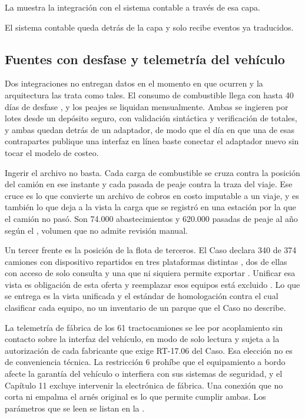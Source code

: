 La  muestra la integración con el sistema contable a través de esa capa.


El sistema contable queda detrás de la capa y solo recibe eventos ya traducidos.


\clearpage
\subsection{Fuentes con desfase y telemetría del vehículo}\label{sec:4-desfase}

Dos integraciones no entregan datos en el momento en que ocurren y la arquitectura las trata como
tales. El consumo de combustible llega con hasta 40 días de desfase , y los
peajes se liquidan mensualmente. Ambas se ingieren por lotes desde un depósito seguro, con validación
sintáctica y verificación de totales, y ambas quedan detrás de un adaptador, de modo que el día en que
una de esas contrapartes publique una interfaz en línea baste conectar el adaptador nuevo sin tocar el
modelo de costeo.

Ingerir el archivo no basta. Cada carga de combustible se cruza contra la posición del camión en ese
instante y cada pasada de peaje contra la traza del viaje. Ese cruce es lo que convierte un archivo de
cobros en costo imputable a un viaje, y es también lo que deja a la vista la carga que se registró en
una estación por la que el camión no pasó. Son 74.000 abastecimientos y 620.000 pasadas de peaje al año
según el , volumen que no admite revisión manual.

Un tercer frente es la posición de la flota de terceros. El Caso declara 340 de 374 camiones con
dispositivo repartidos en tres plataformas distintas , dos de ellas con acceso
de solo consulta y una que ni siquiera permite exportar . Unificar esa vista es
obligación de esta oferta y reemplazar esos equipos está excluido . Lo que se
entrega es la vista unificada y el estándar de homologación contra el cual clasificar cada equipo, no
un inventario de un parque que el Caso no describe.

La telemetría de fábrica de los 61 tractocamiones se lee por acoplamiento sin contacto sobre la
interfaz del vehículo, en modo de solo lectura y sujeta a la autorización de cada fabricante que exige
RT-17.06 del Caso. Esa elección no es de conveniencia técnica. La restricción 6 prohíbe que el
equipamiento a bordo afecte la garantía del vehículo o interfiera con sus sistemas de seguridad, y el
Capítulo 11 excluye intervenir la electrónica de fábrica. Una conexión que no corta ni empalma el arnés
original es lo que permite cumplir ambas. Los parámetros que se leen se listan en la
.

